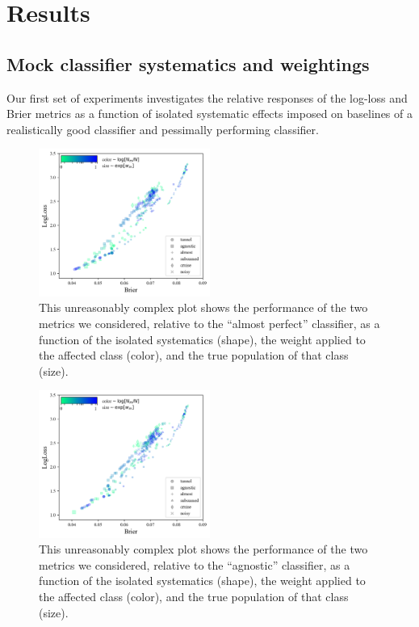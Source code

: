 \section{Results}
\label{sec:results}

\subsection{Mock classifier systematics and weightings}
\label{sec:mockresults}

Our first set of experiments investigates the relative responses of the log-loss and Brier metrics as a function of isolated systematic effects imposed on baselines of a realistically good classifier and pessimally performing classifier.

\begin{figure}
	\begin{center}
		\includegraphics[width=0.5\textwidth]{./fig/almostall_effects_isolated.png}
		\caption{This unreasonably complex plot shows the performance of the two metrics we considered, relative to the ``almost perfect'' classifier, as a function of the isolated systematics (shape), the weight applied to the affected class (color), and the true population of that class (size).}
		\label{fig:plasticc_all_almost}
	\end{center}
\end{figure}

\begin{figure}
	\begin{center}
		\includegraphics[width=0.5\textwidth]{./fig/agnosticall_effects_isolated.png}
		\caption{This unreasonably complex plot shows the performance of the two metrics we considered, relative to the ``agnostic'' classifier, as a function of the isolated systematics (shape), the weight applied to the affected class (color), and the true population of that class (size).}
		\label{fig:plasticc_all_agnostic}
	\end{center}
\end{figure}

